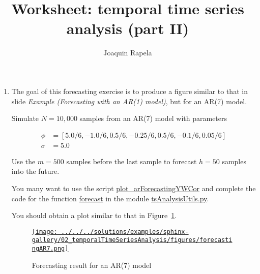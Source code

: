 \documentclass[12pt]{article}
\title{Worksheet: temporal time series analysis (part II)}
\author{Joaquin Rapela}
\begin{document}
\maketitle

\begin{enumerate}

    \item The goal of this forecasting exercise is to produce a figure similar
        to that in slide \emph{Example (Forecasting with an AR(1) model)}, but
        for an AR(7) model.

        Simulate $N=10,000$ samples from an AR(7) model with parameters

        \begin{align*}
            \phi&=[5.0/6,-1.0/6,0.5/6,-0.25/6,0.5/6,-0.1/6,0.05/6]\\
            \sigma&=5.0
        \end{align*}


        \noindent Use the $m=500$ samples before the last sample to forecast $h=50$ samples into
        the future.

        You many want to use the script
        \href{https://github.com/joacorapela/statNeuro2025/blob/master/worksheets/02\_temporalTimeSeriesAnalysis/plot\_arForecastingYWCor.py}{plot\_arForecastingYWCor}
        and complete the code for the function
        \href{https://github.com/joacorapela/statNeuro2025/blob/6cfd79b15e698f4522eec97017f5471a4ff67633/worksheets/02\_temporalTimeSeriesAnalysis/tsAnalysisUtils.py\#L53}{forecast}
        in the module
        \href{https://github.com/joacorapela/statNeuro2025/blob/master/worksheets/02\_temporalTimeSeriesAnalysis/tsAnalysisUtils.py}{tsAnalysisUtils.py}.

        You should obtain a plot similar to that in
        Figure~\ref{fig:forecasting}.

        \begin{figure}
            \begin{center}
                \href{}{\texttt{[image: ../../../solutions/examples/sphinx-gallery/02\_temporalTimeSeriesAnalysis/figures/forecastingAR7.png]}}
            \end{center}
            \caption{Forecasting result for an AR(7) model}
            \label{fig:forecasting}
        \end{figure}


\end{enumerate}
\end{document}
